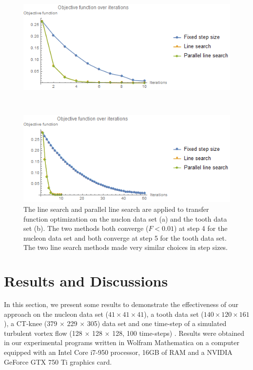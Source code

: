 \begin{figure}
	\centering
	\begin{minipage}{.49\textwidth}
		\includegraphics[width=1\linewidth]{images/nucleon_naive_rms_fixed_linesearch_parallel}
		\subcaption{}
	\end{minipage}~
	\begin{minipage}{.49\textwidth}
		\includegraphics[width=1\linewidth]{images/tooth_naive_rms_fixed_linesearch_parallel}
		\subcaption{}
	\end{minipage}
	\caption{The line search and parallel line search are applied to transfer function optimization on the nuclon data set (a) and the tooth data set (b). The two methods both converge ($F<0.01$) at step 4 for the nucleon data set and both converge at step 5 for the tooth data set. The two line search methods made very similar choices in step sizes.}
	\label{fig:nucleon_naive_tooth_naive_rms_linesearch}
\end{figure}

\section{Results and Discussions}
In this section, we present some results to demonstrate the effectiveness of our approach on the nucleon data set ($ 41 \times 41 \times 41 $), a tooth data set ($ 140 \times 120 \times 161 $), a CT-knee (379 $ \times $ 229 $ \times $ 305) data set \cite{website:Roettger_volume_2013} and one time-step of a simulated turbulent vortex flow (128 $\times$ 128 $\times$ 128, 100 time-steps) \cite{ma_high_2000}.
Results were obtained in our experimental programs written in Wolfram Mathematica on a computer equipped with an Intel Core i7-950 processor, 16GB of RAM and a NVIDIA GeForce GTX 750 Ti graphics card.

